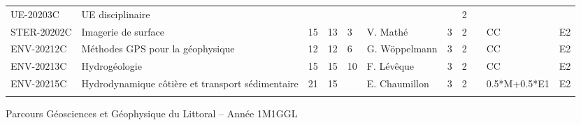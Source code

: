 \documentclass[a4paper,11pt]{article}
\begin{document}
{{\begin{tabular}{lllllllllll}
\rowcolor[HTML]{C0C0C0} 
UE-20203C                      & UE disciplinaire                                                                          &                           &                           &                           &                                    &                             & 2                           &                                    &                                  &                                  \\
STER-20202C                    & Imagerie de surface                                                                       & 15                        & 13                        & 3                         & V. Mathé                           & 3                           & 2                           &                                    & CC                               & E2                               \\
ENV-20212C                     & Méthodes GPS pour la géophysique                                                          & 12                        & 12                        & 6                         & G. Wöppelmann                      & 3                           & 2                           &                                    & CC                               & E2                               \\
ENV-20213C                     & Hydrogéologie                                                                             & 15                        & 15                        & 10                        & F. Lévêque                         & 3                           & 2                           &                                    & CC                               & E2                               \\
ENV-20215C                     & Hydrodynamique côtière et transport sédimentaire                                          & 21                        & 15                        &                           & E. Chaumillon                      & 3                           & 2                           &                                    & 0.5*M+0.5*E1                     & E2                               \\
                               &                                                                                           &                           &                           &                           &                                    &                             &                             &                                    &                                  &                                 
\end{tabular}
}
}{Parcours Géosciences et Géophysique du Littoral -- Année 1}{M1GGL}
\end{document}
